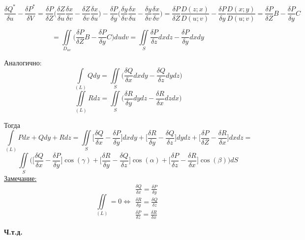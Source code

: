 \documentclass[12pt]{article}
\let\oldint\int
\let\oldiint\iint
\renewcommand{\int}{\oldint\limits}
\renewcommand{\iint}{\oldiint\limits}
\begin{document}
\begin{adjustwidth}{1.5em}{1.5em}
    \[\frac{\delta Q^*}{\delta u}-\frac{\delta P^*}{\delta V}=
    \frac{\delta P}{\delta Z}\Big(
      \frac{\delta Z}{\delta u}\frac{\delta x}{\delta v}-
      \frac{\delta Z}{\delta v}\frac{\delta x}{\delta u}
    \Big)-
    \frac{\delta P}{\delta y}\Big(
      \frac{\delta y}{\delta v}\frac{\delta x}{\delta u}-
      \frac{\delta y}{\delta v}\frac{\delta x}{\delta v}
    \Big)=
    \frac{\delta P}{\delta Z} \frac{D(z;x)}{D(u;v)}-\frac{\delta P}{\delta y}\frac{D(x;y)}{D(u;v)}=
    \frac{\delta P}{\delta Z}B-\frac{\delta P}{\delta y}C\]

    \[\boxed{=} \iint_{D_{uv}}\Big(
      \frac{\delta P}{\delta Z}B - \frac{\delta P}{\delta y}C
    \Big) dudv= \iint_S \frac{\delta P}{\delta z}dxdz - \frac{\delta P}{\delta y}dxdy\]

    Аналогично:
    \[\int_{(L)} Qdy = \iint_S \Big(
      \frac{\delta Q}{\delta x}dxdy - \frac{\delta Q}{\delta z}dydz
    \Big)\]
    \[\iint_{(L)}Rdz = \iint_S \Big(
      \frac{\delta R}{\delta y} dydz - \frac{\delta R}{\delta x}dzdx
    \Big)\]

    Тогда \[\int_{(L)} Pdx+Qdy+Rdz = 
    \iint_S
    \Big[\frac{\delta Q}{\delta x}-\frac{\delta P}{\delta y}\Big]dxdy+
    \Big[\frac{\delta R}{\delta y}-\frac{\delta Q}{\delta z}\Big]dydz+
    \Big[\frac{\delta P}{\delta Z}-\frac{\delta R}{\delta x}\Big]dxdz=\]
    \[\iint_S \Big(
      \Big[\frac{\delta Q}{\delta x}-\frac{\delta P}{\delta y}\Big]\cos(\gamma)+
      \Big[\frac{\delta R}{\delta y}-\frac{\delta Q}{\delta z}\Big]\cos(\alpha)+
      \Big[\frac{\delta P}{\delta z}-\frac{\delta R}{\delta x}\Big]\cos(\beta)
    \Big)dS\]
    \underline{Замечание:} \[\iint_{(L)} = 0 \Leftrightarrow \begin{matrix}
      \frac{\delta Q}{\delta x} = \frac{\delta P}{\delta y}\\
      \frac{\delta R}{\delta y} = \frac{\delta Q}{\delta z}\\
      \frac{\delta P}{\delta z} = \frac{\delta R}{\delta x}
    \end{matrix}\]
  \end{adjustwidth}
  \begin{center}
    \textbf{Ч.т.д.}
  \end{center}
\end{document}
